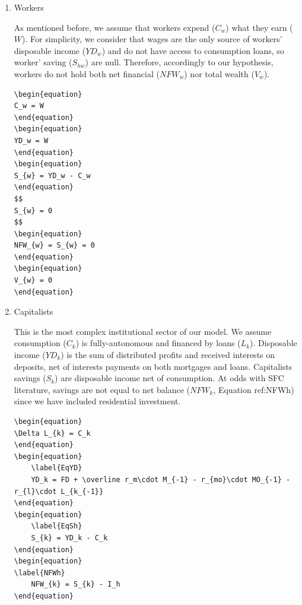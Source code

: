 \documentclass[12pt]{article}
\begin{document}
\begin{enumerate}
\item Workers
\label{sec:orgdf4ddf2}

As mentioned before, we assume that workers expend (\(C_w\)) what they earn (\(W\)). 
For simplicity, we consider that wages are the only source of workers' disposable income (\(YD_{w}\)) and do not have access to consumption loans, so worker' saving (\(S_{hw}\)) are null.
Therefore, accordingly to our hypothesis, workers do not hold both net financial (\(NFW_{w}\)) nor total wealth (\(V_{w}\)).

\begin{verbatim}
\begin{equation}
C_w = W
\end{equation}
\begin{equation}
YD_w = W
\end{equation}
\begin{equation}
S_{w} = YD_w - C_w
\end{equation}
$$
S_{w} = 0
$$
\begin{equation}
NFW_{w} = S_{w} = 0
\end{equation}
\begin{equation}
V_{w} = 0
\end{equation}
\end{verbatim}

\item Capitalists
\label{sec:org26ce641}

This is the most complex institutional sector of our model. 
We assume consumption (\(C_k\)) is fully-autonomous and financed by loans (\(L_{k}\)). 
Disposable income (\(YD_k\)) is the sum of distributed profits and received interests on deposits, net of interests payments
on both mortgages and loans.
Capitalists savings (\(S_{k}\)) are disposable income net of consumption.
At odds with SFC literature, savings are not equal to net balance (\(NFW_{k}\), Equation ref:NFWh) since we have included residential investment.

\begin{verbatim}
\begin{equation}
\Delta L_{k} = C_k
\end{equation}
\begin{equation}
    \label{EqYD}
    YD_k = FD + \overline r_m\cdot M_{-1} - r_{mo}\cdot MO_{-1} - r_{l}\cdot L_{k_{-1}}
\end{equation}
\begin{equation}
    \label{EqSh}
    S_{k} = YD_k - C_k
\end{equation}
\begin{equation}
\label{NFWh}
    NFW_{k} = S_{k} - I_h
\end{equation}
\end{verbatim}



\end{enumerate}
\end{document}
